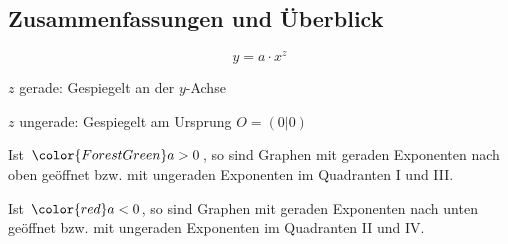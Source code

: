 

\subsection{Zusammenfassungen und Überblick}

$$y = a\cdot{}x^z$$

$z$ gerade: Gespiegelt an der $y$-Achse

$z$ ungerade: Gespiegelt am Ursprung $O=(0|0)$

Ist ${\color{ForestGreen}a>0}$, so sind Graphen mit
geraden Exponenten nach oben geöffnet bzw. mit ungeraden Exponenten im
Quadranten I und III.

Ist ${\color{red}a<0}$, so sind Graphen mit
geraden Exponenten nach unten geöffnet bzw. mit ungeraden Exponenten
im Quadranten II und IV.



\newpage

